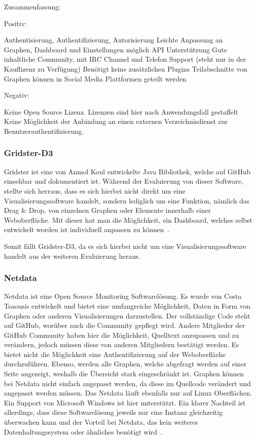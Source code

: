 Zusammenfassung:

Positiv:

\begin{outline}
  \1 Authentisierung, Authentifizierung, Autorisierung
  \1 Leichte Anpassung an Graphen, Dashboard und Einstellungen möglich
  \1 API Unterstützung
  \1 Gute inhaltliche Community, mit IRC Channel und Telefon Support (steht
  nur in der Kauflizenz zu Verfügung)
  \1 Benötigt keine zusätzlichen Plugins
  \1 Teilabschnitte von Graphen können in Social Media Plattformen geteilt
  werden
\end{outline}

Negativ:

\begin{outline}
  \1 Keine Open Source Lizenz. Lizenzen sind hier nach Anwendungsfall
  gestaffelt
  \1 Keine Möglichkeit der Anbindung an einen externen Verzeichnisdienst zur
  Benutzerauthentifizierung.
\end{outline}

\subsubsection{Gridster-D3}
\label{subsubsec:gridster-d3}
Gridster ist eine von Anmol Koul entwickelte Java Bibliothek, welche auf
\gls{GitHub} einsehbar und dokumentiert ist. Während der Evaluierung von dieser
Software, stellte sich herraus, dass es sich hierbei nicht direkt um eine
Visualisierungssoftware handelt, sondern lediglich um eine Funktion, nämlich
das Drag \& Drop, von einzelnen Graphen oder Elemente innerhalb einer
Weboberfläche. Mit dieser hat man die Möglichkeit, ein Dashboard, welches
selbst entwickelt worden ist individuell anpassen zu können~\cite{gridster-d3}.

Somit fällt Gridster-D3, da es sich hierbei nicht um eine
Visualisierungssoftware handelt aus der weiteren Evaluierung heraus.

\subsubsection{Netdata}
\label{subsubsec:netdata}
Netdata ist eine Open Source Monitoring Softwarelösung. Es wurde von Costa
Tsaousis entwickelt und bietet eine umfangreiche Möglichkeit, Daten in Form von
Graphen oder anderen Visualisierungen darzustellen. Der vollständige Code steht
auf GitHub, worüber auch die Community gepflegt wird. Andere Mitglieder der
GitHub Community haben hier die Möglichkeit, Quelltext anzupassen und zu
verändern, jedoch müssen diese von anderen Mitgliedern bestätigt werden. Es
bietet nicht die Möglichkeit eine Authentifizierung auf der Weboberfläche
durchzuführen. Ebenso, werden alle Graphen, welche abgefragt werden auf einer
Seite angezeigt, weshalb die Übersicht stark eingeschränkt ist. Graphen können
bei Netdata nicht einfach angepasst werden, da diese im Quellcode verändert und
angepasst werden müssen. Das Netdata läuft ebenfalls nur auf Linux Oberflächen.
Ein Support von Microsoft Windows ist hier unterstützt. Ein klarer Nachteil ist
allerdings, dass diese Softwarelösung jeweils nur eine Instanz gleichzeitig
überwachen kann und der Vorteil bei Netdata, das kein weiteres
Datenhaltungssystem oder ähnliches benötigt wird~\cite{netdata}.

